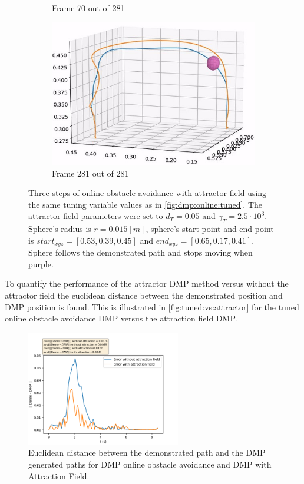 \documentclass[../main.tex]{subfiles}
\begin{document}
\begin{figure}[H]
\begin{subfigure}[b]{0.32\textwidth}
         \caption{Frame 70 out of 281}
    \end{subfigure}
    \hfill
    \begin{subfigure}[b]{0.32\textwidth}
        \centering
        \includegraphics[width=\textwidth]{figures/online_obs/attractor/3D_tuned_w_attractor-281.jpg}
         \caption{Frame 281 out of 281}
    \end{subfigure}
    \caption{Three steps of online obstacle avoidance with attractor field using the same tuning variable values as in \autoref{fig:dmp:online:tuned}. The attractor field parameters were set to $d_{T}=0.05$ and $\gamma_T = 2.5\cdot10^{3}$. Sphere's radius is $r=0.015[m]$, sphere's start point and end point is $start_{xyz}=[0.53, 0.39, 0.45]$ and $end_{xyz}=[0.65, 0.17, 0.41]$. Sphere follows the demonstrated path and stops moving when purple.}
    \label{fig:dmp:attractor:tuned}
\end{figure}

To quantify the performance of the attractor DMP method versus without the attractor field the euclidean distance between the demonstrated position and DMP position is found. This is illustrated in \autoref{fig:tuned:vs:attractor} for the tuned online obstacle avoidance DMP versus the attraction field DMP. 

\begin{figure}[H]
    \centering
         \includegraphics[width=0.6\textwidth]{figures/eval_trajectories/online-dmp_v_attractor-dmp.png}
     \caption{Euclidean distance between the demonstrated path and the DMP generated paths for DMP online obstacle avoidance and DMP with Attraction Field.}
     \label{fig:tuned:vs:attractor}
\end{figure}
\end{document}

